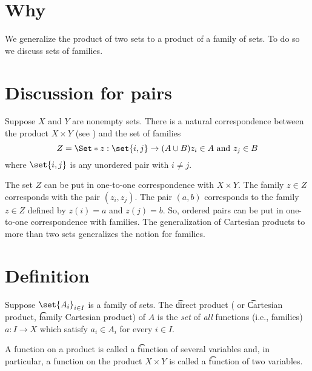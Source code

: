 
\section*{Why}

We generalize the product of two sets to a product of a family of sets.
To do so we discuss sets of families.

\section*{Discussion for pairs}

Suppose $X$ and $Y$ are nonempty sets.
There is a natural correspondence between the product $X \times Y$ (see ) and the set of families
\[
Z = \Set*{z: \set{i, j} \to (A \cup B)}{z_i \in A \text{ and } z_j \in B}
\]
where $\set{i,j}$ is any unordered pair with $i \neq j$.

The set $Z$ can be put in one-to-one correspondence with $X \times  Y$.
The family $z \in Z$ corresponds with the pair $(z_i, z_j)$.
The pair $(a, b)$ corresponds to the family $z \in Z$ defined by $z(i) = a$ and $z(j) = b$.
So, ordered pairs can be put in one-to-one correspondence with families.
The generalization of Cartesian products to more than two sets generalizes the notion for families.

\section*{Definition}

Suppose $\set{A_i}_{i \in I}$ is a family of sets.
The \t{direct product} ( or \t{Cartesian product}, \t{family Cartesian product}) of $A$ is the \textit{set} of \textit{all} functions (i.e., families) $a: I \to X$ which satisfy $a_i \in A_i$ for every $i \in I$.

A function on a product is called a \t{function of several variables} and, in particular, a function on the product $X \times  Y$ is called a \t{function of two variables}.


